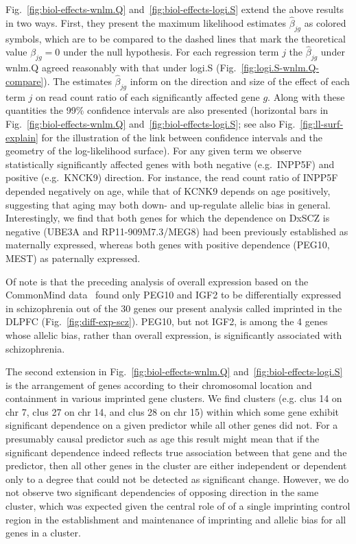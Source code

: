 \documentclass[12pt,letterpaper]{article}
\begin{document}
Fig.~\ref{fig:biol-effects-wnlm.Q} and~\ref{fig:biol-effects-logi.S} extend
the above results in two ways. First, they present the maximum likelihood
estimates \(\hat\beta_{jg}\) as colored symbols, which are to be compared to
the dashed lines that mark the theoretical value \(\beta_{jg} = 0\) under the
null hypothesis.  For each regression term \(j\) the \(\hat\beta_{jg}\) under
wnlm.Q agreed reasonably with that under logi.S
(Fig.~\ref{fig:logi.S-wnlm.Q-compare}).  The estimates \(\hat\beta_{jg}\)
inform on the direction and size of the effect of each term \(j\) on read
count ratio of each significantly affected gene \(g\).  Along with these
quantities the 99\% confidence intervals are also presented (horizontal bars
in Fig.~\ref{fig:biol-effects-wnlm.Q} and~\ref{fig:biol-effects-logi.S}; see
also Fig.~\ref{fig:ll-surf-explain} for the illustration of the link between
confidence intervals and the geometry of the log-likelihood surface). For any
given term we observe statistically significantly affected genes with both
negative (e.g.~INPP5F) and positive (e.g.~KNCK9) direction.  For instance, the
read count ratio of INPP5F depended negatively on age, while that of KCNK9
depends on age positively, suggesting that aging may both down- and
up-regulate allelic bias in general. Interestingly, we find that both genes
for which the dependence on DxSCZ is negative (UBE3A and RP11-909M7.3/MEG8)
had been previously established as maternally expressed, whereas both genes
with positive dependence (PEG10, MEST) as paternally expressed.

Of note is that the preceding analysis of overall expression based on the
CommonMind data~\cite{Fromer2016a} found only PEG10 and IGF2 to be
differentially expressed in schizophrenia out of the 30 genes our present
analysis called imprinted in the DLPFC (Fig.~\ref{fig:diff-exp-scz}). PEG10,
but not IGF2, is among the 4 genes whose allelic bias, rather than overall
expression, is significantly associated with schizophrenia.

The second extension in Fig.~\ref{fig:biol-effects-wnlm.Q}
and~\ref{fig:biol-effects-logi.S} is the arrangement of genes according to
their chromosomal location and containment in various imprinted gene clusters.
We find clusters (e.g. clus 14 on chr 7, clus 27 on chr 14, and clus 28 on
chr 15) within which some gene exhibit significant dependence on a given
predictor while all other genes did not. For a presumably causal predictor such
as age this result might mean that if the significant dependence indeed
reflects true association between that gene and the predictor, then all other
genes in the cluster are either independent or dependent only to a degree that
could not be detected as significant change. However, we do not observe two
significant dependencies of opposing direction in the same cluster, which was
expected given the central role of of a single imprinting control region in
the establishment and maintenance of imprinting and allelic bias for all
genes in a cluster.
\end{document}
